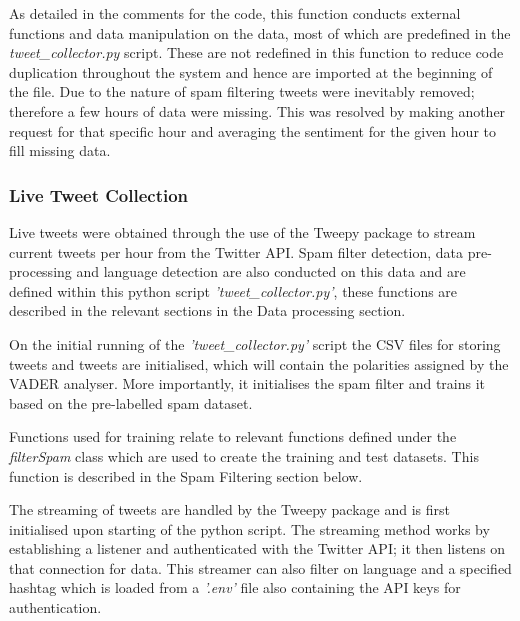 \documentclass[oneside, 12pt]{article}
\begin{document}
			As detailed in the comments for the code, this function conducts external functions and data manipulation on the data, most of which are predefined in the \textit{tweet\_collector.py} script. These are not redefined in this function to reduce code duplication throughout the system and hence are imported at the beginning of the file. Due to the nature of spam filtering tweets were inevitably removed; therefore a few hours of data were missing. This was resolved by making another request for that specific hour and averaging the sentiment for the given hour to fill missing data.
			
			\subsubsection{Live Tweet Collection}
			Live tweets were obtained through the use of the Tweepy package to stream current tweets per hour from the Twitter API. Spam filter detection, data pre-processing and language detection are also conducted on this data and are defined within this python script \textit{'tweet\_collector.py'}, these functions are described in the relevant sections in the Data processing section.
			
			On the initial running of the \textit{'tweet\_collector.py'} script the CSV files for storing tweets and tweets are initialised, which will contain the polarities assigned by the VADER analyser. More importantly, it initialises the spam filter and trains it based on the pre-labelled spam dataset.
			
			Functions used for training relate to relevant functions defined under the \textit{filterSpam} class which are used to create the training and test datasets. This function is described in the Spam Filtering section below.
			
			The streaming of tweets are handled by the Tweepy package and is first initialised upon starting of the python script. The streaming method works by establishing a listener and authenticated with the Twitter API; it then listens on that connection for data. This streamer can also filter on language and a specified hashtag which is loaded from a \textit{'.env'} file also containing the API keys for authentication.
			\newline
			
\end{document}
